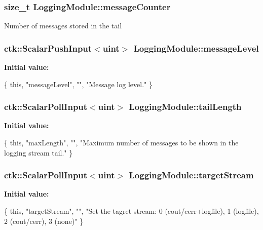 \subsubsection[{\texorpdfstring{message\+Counter}{messageCounter}}]{\setlength{\rightskip}{0pt plus 5cm}size\+\_\+t Logging\+Module\+::message\+Counter}\hypertarget{structLoggingModule_a30626e4224e872a8b8ea94f4b3df810f}{}\label{structLoggingModule_a30626e4224e872a8b8ea94f4b3df810f}
Number of messages stored in the tail 
\subsubsection[{\texorpdfstring{message\+Level}{messageLevel}}]{\setlength{\rightskip}{0pt plus 5cm}ctk\+::\+Scalar\+Push\+Input$<$uint$>$ Logging\+Module\+::message\+Level}\hypertarget{structLoggingModule_aff12a4b08ef4ae4992880cdb953a3544}{}\label{structLoggingModule_aff12a4b08ef4ae4992880cdb953a3544}
{\bfseries Initial value\+:}
\begin{DoxyCode}
\{ \textcolor{keyword}{this}, \textcolor{stringliteral}{"messageLevel"}, \textcolor{stringliteral}{""},
        \textcolor{stringliteral}{"Message log level."} \}
\end{DoxyCode}
\subsubsection[{\texorpdfstring{tail\+Length}{tailLength}}]{\setlength{\rightskip}{0pt plus 5cm}ctk\+::\+Scalar\+Poll\+Input$<$uint$>$ Logging\+Module\+::tail\+Length}\hypertarget{structLoggingModule_a04e42940e162a4b5788bfc837f5a0854}{}\label{structLoggingModule_a04e42940e162a4b5788bfc837f5a0854}
{\bfseries Initial value\+:}
\begin{DoxyCode}
\{ \textcolor{keyword}{this}, \textcolor{stringliteral}{"maxLength"}, \textcolor{stringliteral}{""},
      \textcolor{stringliteral}{"Maximum number of messages to be shown in the logging stream tail."} \}
\end{DoxyCode}
\subsubsection[{\texorpdfstring{target\+Stream}{targetStream}}]{\setlength{\rightskip}{0pt plus 5cm}ctk\+::\+Scalar\+Poll\+Input$<$uint$>$ Logging\+Module\+::target\+Stream}\hypertarget{structLoggingModule_a514d6e2c4e43b577c71e25c09be6b6d0}{}\label{structLoggingModule_a514d6e2c4e43b577c71e25c09be6b6d0}
{\bfseries Initial value\+:}
\begin{DoxyCode}
\{ \textcolor{keyword}{this}, \textcolor{stringliteral}{"targetStream"}, \textcolor{stringliteral}{""},
          \textcolor{stringliteral}{"Set the tagret stream: 0 (cout/cerr+logfile), 1 (logfile), 2 (cout/cerr), 3 (none)"} \}
\end{DoxyCode}


